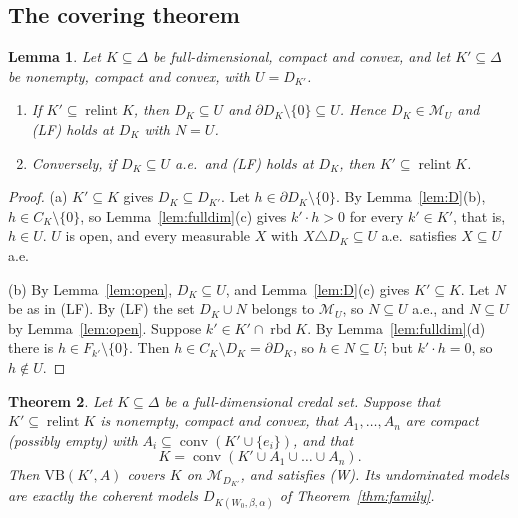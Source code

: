 \documentclass[11pt]{article}
\newcommand{\M}{\mathcal{M}}
\newcommand{\VB}{\mathrm{VB}}
\DeclareMathOperator{\conv}{conv}
\DeclareMathOperator{\relint}{relint}
\DeclareMathOperator{\rbd}{rbd}
\theoremstyle{plain}
\newtheorem{theorem}{Theorem}[section]
\newtheorem{lemma}[theorem]{Lemma}
\theoremstyle{definition}
\theoremstyle{remark}
\begin{document}
\subsection{The covering theorem}\label{sec:cover}

\begin{lemma}\label{lem:LF}
Let $K\subseteq\Delta$ be full-dimensional, compact and convex, and let $K'\subseteq\Delta$
be nonempty, compact and convex, with $U=D_{K'}$.
\begin{enumerate}[label=(\alph*)]
  \item If $K'\subseteq\relint K$, then $D_K\subseteq U$ and $\partial D_K\setminus\{0\}
  \subseteq U$. Hence $D_K\in\M_U$ and (LF) holds at $D_K$ with $N=U$.
  \item Conversely, if $D_K\subseteq U$ a.e.\ and (LF) holds at $D_K$, then $K'\subseteq
  \relint K$.
\end{enumerate}
\end{lemma}

\begin{proof}
(a) $K'\subseteq K$ gives $D_K\subseteq D_{K'}$. Let $h\in\partial D_K\setminus\{0\}$. By
Lemma~\ref{lem:D}(b), $h\in C_K\setminus\{0\}$, so Lemma~\ref{lem:fulldim}(c) gives
$k'\cdot h>0$ for every $k'\in K'$, that is, $h\in U$. $U$ is open, and every measurable
$X$ with $X\triangle D_K\subseteq U$ a.e.\ satisfies $X\subseteq U$ a.e.

(b) By Lemma~\ref{lem:open}, $D_K\subseteq U$, and Lemma~\ref{lem:D}(c) gives
$K'\subseteq K$. Let $N$ be as in (LF). By (LF) the set $D_K\cup N$ belongs to $\M_U$, so
$N\subseteq U$ a.e., and $N\subseteq U$ by Lemma~\ref{lem:open}. Suppose $k'\in K'\cap\rbd
K$. By Lemma~\ref{lem:fulldim}(d) there is $h\in F_{k'}\setminus\{0\}$. Then $h\in
C_K\setminus D_K=\partial D_K$, so $h\in N\subseteq U$; but $k'\cdot h=0$, so $h\notin U$.
\end{proof}

\begin{theorem}\label{thm:cover}
Let $K\subseteq\Delta$ be a full-dimensional credal set. Suppose that $K'\subseteq\relint
K$ is nonempty, compact and convex, that $A_1,\dots,A_n$ are compact (possibly empty)
with $A_i\subseteq\conv(K'\cup\{e_i\})$, and that
\[
  K=\conv(K'\cup A_1\cup\dots\cup A_n).
\]
Then $\VB(K',A)$ covers $K$ on $\M_{D_{K'}}$, and satisfies (W). Its undominated models
are exactly the coherent models $D_{K(W_0,\beta,\alpha)}$ of Theorem~\ref{thm:family}.
\end{theorem}
\end{document}
